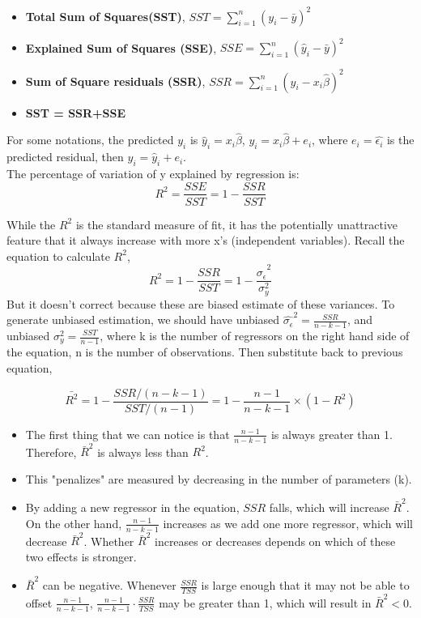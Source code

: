 \documentclass[11pt]{article}
\begin{document}
\begin{itemize}
    \item \textbf{Total Sum of Squares(SST)}, $SST =  \sum_{i=1}^{n} \left( y_i - \bar{y}\right)^2$ 
    \item \textbf{Explained Sum of Squares (SSE)}, $SSE =  \sum_{i=1}^{n} \left( \hat{y}_i - \bar{y}\right)^2$
    \item \textbf{Sum of Square residuals (SSR)}, $SSR =  \sum_{i=1}^{n} \left( y_i - x_i\hat{\beta}\right)^2$
    \item \textbf{SST = SSR+SSE}
\end{itemize}
For some notations, the predicted $y_i$ is $\hat{y}_i=x_i\hat{\beta}$, $y_i=x_i\hat{\beta}+e_i$, where $e_i=\hat{\epsilon_i}$ is the 
predicted residual, then $y_i=\hat{y}_i+e_i$. \\

The percentage of variation of y explained by regression is:
\[
R^2=\frac{SSE}{SST} = 1 - \frac{SSR}{SST}
\]

While the $R^2$ is the standard measure of fit, it has the potentially unattractive feature that it always increase with more x's (independent variables).
Recall the equation to calculate $R^2$, 
 \[
R^2= 1 - \frac{SSR}{SST} = 1- \frac{\hat{\sigma_\epsilon}^2}{\sigma_y^2}
\]
But it doesn't correct because these are biased estimate of these variances. To generate unbiased estimation, we should have 
unbiased $\hat{\sigma_\epsilon}^2=\frac{SSR}{n-k-1}$, and unbiased $\sigma_y^2=\frac{SST}{n-1}$, where k is the number of regressors 
on the right hand side of the equation, n is the number of observations. Then substitute back to previous equation,

\[
    \bar{R^2}= 1 - \frac{SSR/(n-k-1)}{SST/(n-1)} = 1- \frac{n-1}{n-k-1}\times(1-R^2)
    \]

    \begin{itemize}
        \item The first thing that we can notice is that \( \frac{n-1}{n-k-1} \) is always greater than 1. Therefore, \( \bar{R}^2 \) is always less than \( R^2 \).
        
        \item This "penalizes" are measured by decreasing in the number of parameters (k). 
        
        \item By adding a new regressor in the equation, \( SSR \) falls, which will increase \( \bar{R}^2 \). On the other hand, \( \frac{n-1}{n-k-1} \) increases as we add one more regressor, which will decrease \( \bar{R}^2 \). Whether \( \bar{R}^2 \) increases or decreases depends on which of these two effects is stronger.
        
        \item \( \bar{R}^2 \) can be negative. Whenever \( \frac{SSR}{TSS} \) is large enough that it may not be able to offset \( \frac{n-1}{n-k-1} \), \( \frac{n-1}{n-k-1} \cdot \frac{SSR}{TSS} \) may be greater than 1, which will result in \( \bar{R}^2 < 0 \).
    \end{itemize}
\end{document}
